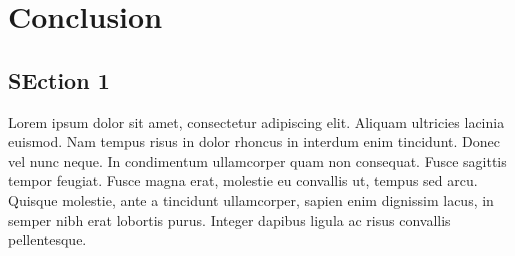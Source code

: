 \chapter{Conclusion} %

\label{Chapter11} %



\section{SEction 1}

Lorem ipsum dolor sit amet, consectetur adipiscing elit. Aliquam ultricies lacinia euismod. Nam tempus risus in dolor rhoncus in interdum enim tincidunt. Donec vel nunc neque. In condimentum ullamcorper quam non consequat. Fusce sagittis tempor feugiat. Fusce magna erat, molestie eu convallis ut, tempus sed arcu. Quisque molestie, ante a tincidunt ullamcorper, sapien enim dignissim lacus, in semper nibh erat lobortis purus. Integer dapibus ligula ac risus convallis pellentesque.

